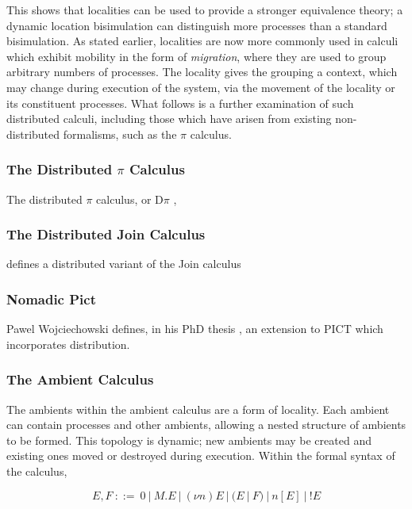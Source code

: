 This shows that localities can be used to provide a stronger equivalence
theory; a dynamic location bisimulation can distinguish more processes
than a standard bisimulation.  As stated earlier, localities are now
more commonly used in calculi which exhibit mobility in the form of
\emph{migration}, where they are used to group arbitrary numbers of
processes.  The locality gives the grouping a context, which may change
during execution of the system, via the movement of the locality or its
constituent processes.  What follows is a further examination of such
distributed calculi, including those which have arisen from existing
non-distributed formalisms, such as the $\pi$ calculus.

\subsubsection{The Distributed $\pi$ Calculus}

The distributed $\pi$ calculus, or D$\pi$ \cite{hennessy:dpi98},

\subsubsection{The Distributed Join Calculus}

\cite{djoin} defines a distributed variant of the Join calculus

\subsubsection{Nomadic Pict}

Pawel Wojciechowski defines, in his PhD thesis \cite{wojciechowski:phd},
an extension to PICT \cite{daveturner:phd} which incorporates
distribution.

\subsubsection{The Ambient Calculus}
\label{ambientcalculus}

The ambients within the ambient calculus \cite{amb} are a form of
locality.  Each ambient can contain processes and other ambients,
allowing a nested structure of ambients to be formed.  This topology
is dynamic; new ambients may be created and existing ones moved or
destroyed during execution.  Within the formal syntax of the calculus,

\begin{equation}
\label{ambsyntax}
  E, F\ ::=\ 
  0\ |\ 
  M.E\ |\ 
  (\nu n)E\ |\ 
  (E\ |\ F)\ |\ 
  n[E]\ |\ 
  !E
\end{equation}

